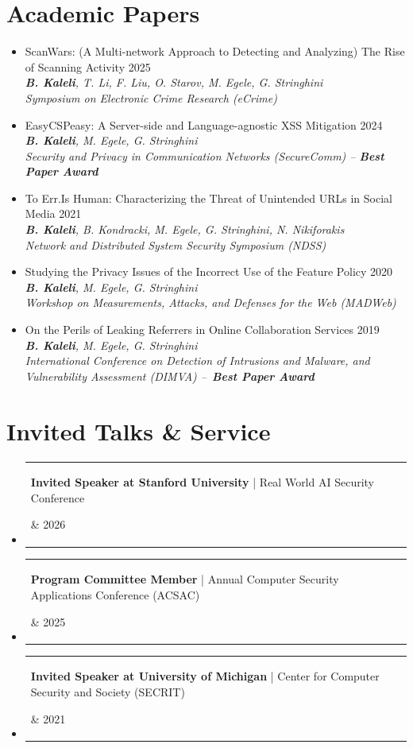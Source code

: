 \documentclass[letterpaper,11pt]{article}
\makeatletter
\newcommand{\resumePublicationHeading}[4]{
    \item {\small #1} \hfill {\small #2}\\
      \textit{\small #3}\\
      \textit{\footnotesize #4}\vspace{-9pt}
}
\newcommand{\resumeProjectHeading}[2]{
    \item
    \begin{tabular*}{1.0\textwidth}{l@{\extracolsep{\fill}}r}
      \small\parbox[t]{0.95\textwidth}{#1} & {\small #2}\\     
    \end{tabular*}\vspace{-9pt}
}
\newcommand{\resumeSubHeadingListStart}{\begin{itemize}[leftmargin=0.0in, label={}]}
\newcommand{\resumeSubHeadingListEnd}{\end{itemize}}
\newcommand{\resumeItemListStart}{\begin{itemize}[leftmargin=0.15in, label={$\bullet$}, topsep=0pt]}
\newcommand{\resumeItemListEnd}{\end{itemize}}
\makeatother
\begin{document}
\section{Academic Papers}
  \resumeItemListStart
    \resumePublicationHeading
        {ScanWars: (A Multi-network Approach to Detecting and Analyzing) The Rise of Scanning Activity}{2025}
        {\textbf{B. Kaleli}, T. Li, F. Liu, O. Starov, M. Egele, G. Stringhini}{Symposium on Electronic Crime Research (eCrime)}
    \resumePublicationHeading
        {EasyCSPeasy: A Server-side and Language-agnostic XSS Mitigation}{2024}
        {\textbf{B. Kaleli}, M. Egele, G. Stringhini}{Security and Privacy in Communication Networks (SecureComm) -- \textbf{Best Paper Award}}
    \resumePublicationHeading
        {To Err.Is Human: Characterizing the Threat of Unintended URLs in Social Media}{2021}
        {\textbf{B. Kaleli}, B. Kondracki, M. Egele, G. Stringhini, N. Nikiforakis}{Network and Distributed System Security Symposium (NDSS)}
    \resumePublicationHeading
        {Studying the Privacy Issues of the Incorrect Use of the Feature Policy}{2020}
        {\textbf{B. Kaleli}, M. Egele, G. Stringhini}{Workshop on Measurements, Attacks, and Defenses for the Web (MADWeb)}
    \resumePublicationHeading
        {On the Perils of Leaking Referrers in Online Collaboration Services}{2019}
        {\textbf{B. Kaleli}, M. Egele, G. Stringhini}{International Conference on Detection of Intrusions and Malware, and Vulnerability Assessment (DIMVA) --~\textbf{Best Paper Award}}
  \resumeItemListEnd
\vspace{0.01in}

\section{Invited Talks \& Service}
  \resumeSubHeadingListStart
    \resumeProjectHeading
        {\textbf{Invited Speaker at Stanford University} | Real World AI Security Conference}{2026}
    \resumeProjectHeading
        {\textbf{Program Committee Member} | Annual Computer Security Applications Conference (ACSAC)}{2025}
    \resumeProjectHeading
        {\textbf{Invited Speaker at University of Michigan} | Center for Computer Security and Society (SECRIT)}{2021}
  \resumeSubHeadingListEnd
\vspace{0.01in}

\end{document}
